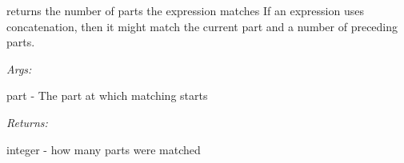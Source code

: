 \documentclass[letterpaper,10pt,english]{sphinxmanual}
\begin{document}
\begin{fulllineitems}
\begin{fulllineitems}
\label{modules/index:aosb.core.PointCutExpressionNot.numberOfMatchingParts}
returns the number of parts the expression matches
\textbar{} If an expression uses concatenation, then it might match the current part and a number of preceding parts.

\begin{DUlineblock}{0em}
\item[] \emph{Args:}
\item[]
\begin{DUlineblock}{\DUlineblockindent}
\item[] part - The part at which matching starts
\end{DUlineblock}
\end{DUlineblock}

\begin{DUlineblock}{0em}
\item[] \emph{Returns:}
\item[]
\begin{DUlineblock}{\DUlineblockindent}
\item[] integer - how many parts were matched
\end{DUlineblock}
\end{DUlineblock}

\end{fulllineitems}


\begin{fulllineitems}
\label{modules/index:aosb.core.PointCutExpressionNot.left}
\end{fulllineitems}


\begin{fulllineitems}
\label{modules/index:aosb.core.PointCutExpressionNot.right}
\end{fulllineitems}


\end{fulllineitems}

\end{document}
